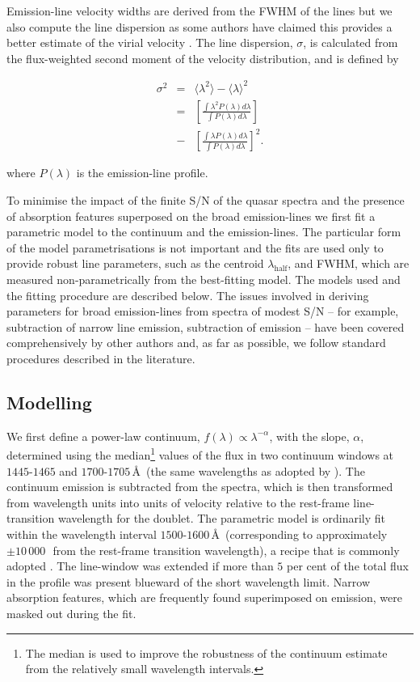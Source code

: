 Emission-line velocity widths are derived from the FWHM of the lines but we also compute the line dispersion as some authors have claimed this provides a better estimate of the virial velocity \citep{denney13}.
The line dispersion, $\sigma$, is calculated from the flux-weighted second moment of the velocity distribution, and is defined by

\begin{eqnarray}
  \sigma^2 &=& \langle \lambda^2 \rangle - \langle \lambda \rangle^2 \\
  &=& \left[ \frac {\int \lambda^2 P(\lambda) d\lambda} {\int P(\lambda) d\lambda} \right] \\
  &-& \left[ \frac {\int \lambda P(\lambda) d\lambda} {\int P(\lambda) d\lambda} \right]^2.
\end{eqnarray}

\noindent where $P(\lambda)$ is the emission-line profile.

To minimise the impact of the finite S/N of the quasar spectra and the presence of absorption features superposed on the broad emission-lines we first fit a parametric model to the continuum and the emission-lines.
The particular form of the model parametrisations is not important and the fits are used only to provide robust line parameters, such as the centroid $\lambda_{\text{half}}$, and FWHM, which are measured non-parametrically from the best-fitting model.
The models used and the fitting procedure are described below.
The issues involved in deriving parameters for broad emission-lines from spectra of modest S/N -- for example, subtraction of narrow line emission, subtraction of  emission -- have been covered comprehensively by other authors \citep[e.g.][]{shen11,shen12,denney13,shen16a} and, as far as possible, we follow standard procedures described in the literature.

\subsection{Modelling }
\label{sec:civ}

We first define a power-law continuum, $f(\lambda) \propto \lambda^{-\alpha}$, with the slope, $\alpha$, determined using the median\footnote{The median is used to improve the robustness of the continuum estimate from the relatively small wavelength intervals.} values of the flux in two continuum windows at $1445$-$1465$ and $1700$-$1705$\,\AA\, (the same wavelengths as adopted by \citealt{shen11}).
The continuum emission is subtracted from the spectra, which is then transformed from wavelength units into units of velocity relative to the rest-frame line-transition wavelength for the  doublet.
The parametric model is ordinarily fit within the wavelength interval $1500$-$1600$\,\AA\, (corresponding to approximately $\pm 10\,000$\,\kms\, from the rest-frame transition wavelength), a recipe that is commonly adopted \citep[e.g.][]{shen11,denney13}.
The line-window was extended if more than $5$ per cent of the total flux in the profile was present blueward of the short wavelength limit.
Narrow absorption features, which are frequently found superimposed on  emission, were masked out during the fit.

